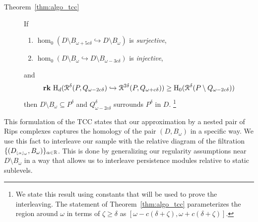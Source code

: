 \begin{description}
  \item[Theorem~\ref{thm:algo_tcc}] If
    \begin{enumerate}[label=\Roman*.]
      \item $\hom_0(D\setminus B_{\omega+5c\delta}\hookrightarrow D\setminus B_\omega)$ is \emph{surjective},
      \item $\hom_0(D\setminus B_\omega\hookrightarrow D\setminus B_{\omega-3c\delta})$ is \emph{injective},
    \end{enumerate}
    and
    \[ \mathbf{rk}~\mathrm{H}_d(\mathcal{R}^\delta(P, Q_{\omega - 2c\delta})\hookrightarrow \mathcal{R}^{2\delta}(P, Q_{\omega+c\delta}))\geq \mathrm{H}_0(\mathcal{R}^\delta(P\setminus Q_{\omega-2c\delta})) \]
    then $D\setminus B_\omega\subseteq P^\delta$ and $Q_{\omega-2c\delta}^\delta$ surrounds $P^\delta$ in $D$.
    \footnote{We state this result using constants that will be used to prove the interleaving.
      The statement of Theorem~\ref{thm:algo_tcc} parameterizes the region around $\omega$ in terms of $\zeta\geq\delta$ as $[\omega-c(\delta+\zeta),\omega+c(\delta+\zeta)]$.}
\end{description}

This formulation of the TCC states that our approximation by a nested pair of Rips complexes captures the homology of the pair $(D,B_\omega)$ in a specific way.
We use this fact to interleave our sample with the relative diagram of the filtration $\{(D_{\scriptscriptstyle \lfloor\alpha\rfloor_{\omega}}, B_\omega)\}_{\alpha\in\mathbb{R}}$.
This is done by generalizing our regularity assumptions near $D\setminus B_\omega$ in a way that allows us to interleave persistence modules relative to static sublevels.


